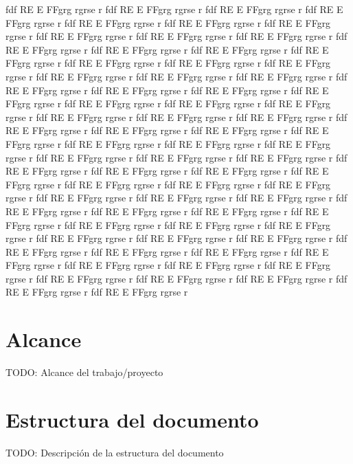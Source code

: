 fdf RE E FFgrg rgrse  r
fdf RE E FFgrg rgrse  r
fdf RE E FFgrg rgrse  r
fdf RE E FFgrg rgrse  r
fdf RE E FFgrg rgrse  r
fdf RE E FFgrg rgrse  r
fdf RE E FFgrg rgrse  r
fdf RE E FFgrg rgrse  r
fdf RE E FFgrg rgrse  r
fdf RE E FFgrg rgrse  r
fdf RE E FFgrg rgrse  r
fdf RE E FFgrg rgrse  r
fdf RE E FFgrg rgrse  r
fdf RE E FFgrg rgrse  r
fdf RE E FFgrg rgrse  r
fdf RE E FFgrg rgrse  r
fdf RE E FFgrg rgrse  r
fdf RE E FFgrg rgrse  r
fdf RE E FFgrg rgrse  r
fdf RE E FFgrg rgrse  r
fdf RE E FFgrg rgrse  r
fdf RE E FFgrg rgrse  r
fdf RE E FFgrg rgrse  r
fdf RE E FFgrg rgrse  r
fdf RE E FFgrg rgrse  r
fdf RE E FFgrg rgrse  r
fdf RE E FFgrg rgrse  r
fdf RE E FFgrg rgrse  r
fdf RE E FFgrg rgrse  r
fdf RE E FFgrg rgrse  r
fdf RE E FFgrg rgrse  r
fdf RE E FFgrg rgrse  r
fdf RE E FFgrg rgrse  r
fdf RE E FFgrg rgrse  r
fdf RE E FFgrg rgrse  r
fdf RE E FFgrg rgrse  r
fdf RE E FFgrg rgrse  r
fdf RE E FFgrg rgrse  r
fdf RE E FFgrg rgrse  r
fdf RE E FFgrg rgrse  r
fdf RE E FFgrg rgrse  r 
fdf RE E FFgrg rgrse  r
fdf RE E FFgrg rgrse  r
fdf RE E FFgrg rgrse  r
fdf RE E FFgrg rgrse  r
fdf RE E FFgrg rgrse  r
fdf RE E FFgrg rgrse  r
fdf RE E FFgrg rgrse  r
fdf RE E FFgrg rgrse  r
fdf RE E FFgrg rgrse  r
fdf RE E FFgrg rgrse  r
fdf RE E FFgrg rgrse  r
fdf RE E FFgrg rgrse  r
fdf RE E FFgrg rgrse  r
fdf RE E FFgrg rgrse  r
fdf RE E FFgrg rgrse  r
fdf RE E FFgrg rgrse  r
fdf RE E FFgrg rgrse  r
fdf RE E FFgrg rgrse  r
fdf RE E FFgrg rgrse  r
fdf RE E FFgrg rgrse  r
fdf RE E FFgrg rgrse  r
fdf RE E FFgrg rgrse  r
fdf RE E FFgrg rgrse  r
fdf RE E FFgrg rgrse  r
fdf RE E FFgrg rgrse  r
fdf RE E FFgrg rgrse  r
fdf RE E FFgrg rgrse  r
fdf RE E FFgrg rgrse  r
fdf RE E FFgrg rgrse  r
fdf RE E FFgrg rgrse  r
fdf RE E FFgrg rgrse  r

\section{Alcance}

TODO: Alcance del trabajo/proyecto

\section{Estructura del documento}

TODO: Descripción de la estructura del documento